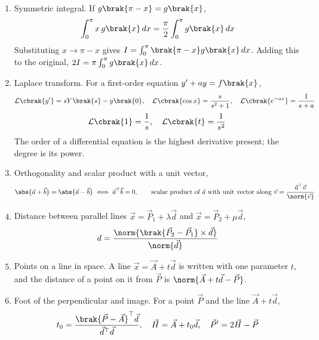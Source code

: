 \begin{enumerate}[label=\thesubsection.\arabic*, ref=\thesubsection.\theenumi]
\item Symmetric integral. If $g\brak{\pi - x} = g\brak{x}$,
\begin{align}
	\int_0^\pi x\,g\brak{x}\,dx = \frac{\pi}{2}\int_0^\pi g\brak{x}\,dx \label{eq:CBSE12-king}
\end{align}
\solution
Substituting $x \to \pi - x$ gives $I = \int_0^\pi\brak{\pi - x}g\brak{x}\,dx$. Adding this to the original, $2I = \pi\int_0^\pi g\brak{x}\,dx$.
\item Laplace transform. For a first-order equation $y^{\prime} + ay = f\brak{x}$,
\begin{align}
	\mathcal{L}\cbrak{y^{\prime}} = sY\brak{s} - y\brak{0}, \quad \mathcal{L}\cbrak{\cos x} = \frac{s}{s^2+1}, \quad \mathcal{L}\cbrak{e^{-ax}} = \frac{1}{s+a} \label{eq:CBSE12-laplace}
\end{align}
\begin{align}
	\mathcal{L}\cbrak{1} = \frac{1}{s}, \quad \mathcal{L}\cbrak{t} = \frac{1}{s^2} \label{eq:CBSE12-laplace2}
\end{align}
The order of a differential equation is the highest derivative present; the degree is its power. 
\item Orthogonality and scalar product with a unit vector,
\begin{align}
	\abs{\vec{a}+\vec{b}} = \abs{\vec{a}-\vec{b}} \iff \vec{a}^{\top}\vec{b} = 0, \qquad
	\text{scalar product of } \vec{a} \text{ with unit vector along } \vec{v} = \frac{\vec{a}^{\top}\vec{v}}{\norm{\vec{v}}} \label{eq:CBSE12-vec}
\end{align}
\item Distance between parallel lines $\vec{x} = \vec{P}_1 + \lambda\vec{d}$ and $\vec{x} = \vec{P}_2 + \mu\vec{d}$,
\begin{align}
	d = \frac{\norm{\brak{\vec{P}_2 - \vec{P}_1}\times\vec{d}}}{\norm{\vec{d}}} \label{eq:CBSE12-pardist}
\end{align}

\item Points on a line in space. A line $\vec{x} = \vec{A} + t\vec{d}$ is written with one parameter $t$, and the distance of a point on it from $\vec{P}$ is $\norm{\vec{A} + t\vec{d} - \vec{P}}$.
\item Foot of the perpendicular and image. For a point $\vec{P}$ and the line $\vec{A} + t\vec{d}$,
\begin{align}
	t_0 = \frac{\brak{\vec{P}-\vec{A}}^{\top}\vec{d}}{\vec{d}^{\top}\vec{d}}, \quad \vec{H} = \vec{A} + t_0\vec{d}, \quad \vec{P}^{\prime} = 2\vec{H} - \vec{P} \label{eq:CBSE12-image}
\end{align}


\end{enumerate}
